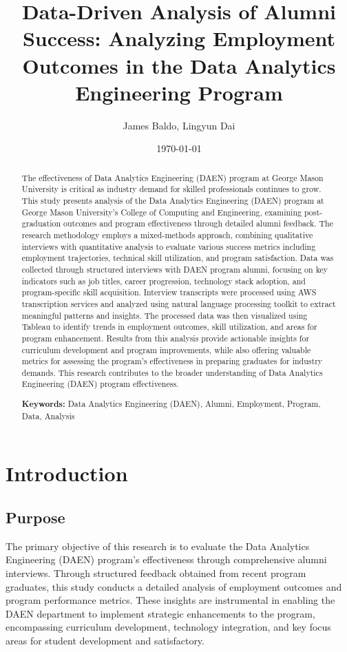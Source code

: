 \documentclass[12pt,a4paper]{article}
\title{\textbf{Data-Driven Analysis of Alumni Success: Analyzing Employment Outcomes in the Data Analytics Engineering Program}}
\author{James Baldo, Lingyun Dai}
\date{\today}
\begin{document}
\maketitle

\begin{abstract}
The effectiveness of Data Analytics Engineering (DAEN) program at George 
Mason University is critical as industry demand for skilled professionals 
continues to grow. This study presents analysis of the Data Analytics 
Engineering (DAEN) program at George Mason University's College of 
Computing and Engineering, examining post-graduation outcomes and 
program effectiveness through detailed alumni feedback. The 
research methodology employs a mixed-methods approach, combining 
qualitative interviews with quantitative analysis to evaluate 
various success metrics including employment trajectories, 
technical skill utilization, and program satisfaction. Data was 
collected through structured interviews with DAEN program alumni, 
focusing on key indicators such as job titles, career progression, 
technology stack adoption, and program-specific skill acquisition. 
Interview transcripts were processed using AWS transcription services 
and analyzed using natural language processing toolkit to extract 
meaningful patterns and insights. The processed data was then 
visualized using Tableau to identify trends in employment outcomes, 
skill utilization, and areas for program enhancement. Results from 
this analysis provide actionable insights for curriculum development 
and program improvements, while also offering valuable metrics for 
assessing the program's effectiveness in preparing graduates for 
industry demands. This research contributes to the broader 
understanding of Data Analytics Engineering (DAEN) program 
effectiveness.

\textbf{Keywords:} Data Analytics Engineering (DAEN), 
Alumni, Employment, Program, Data, Analysis
\end{abstract}

\newpage
\tableofcontents
\newpage

\section{Introduction}
\subsection{Purpose}
The primary objective of this research is to evaluate the Data 
Analytics Engineering (DAEN) program's effectiveness through 
comprehensive alumni interviews. Through structured feedback 
obtained from recent program graduates, this study conducts a 
detailed analysis of employment outcomes and program performance 
metrics. These insights are instrumental in enabling the DAEN 
department to implement strategic enhancements to the program, 
encompassing curriculum development, technology integration, 
and key focus areas for student development and satisfactory.
\end{document}
